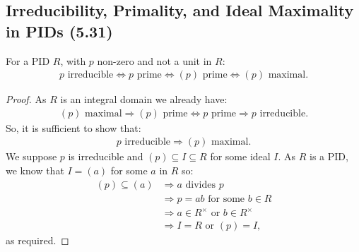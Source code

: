 \subsection{Irreducibility, Primality, and Ideal Maximality in PIDs (5.31)} \label{5.31}

For a PID $R$, with $p$ non-zero and not a unit in $R$: \begin{align*}
    p \text{ irreducible} 
    \Longleftrightarrow p \text{ prime}
    \Longleftrightarrow (p) \text{ prime}
    \Longleftrightarrow (p) \text{ maximal}.
\end{align*}

\begin{proof}
    As $R$ is an integral domain we already have: \begin{align*}
        (p) \text{ maximal}
        \Longrightarrow (p) \text{ prime}
        \Longleftrightarrow p \text{ prime}
        \Longrightarrow p \text{ irreducible}.
    \end{align*} So, it is sufficient to show that: \begin{align*}
        p \text{ irreducible} \Longrightarrow (p) \text{ maximal}.
    \end{align*} We suppose $p$ is irreducible and $(p) \subseteq I \subseteq R$
    for some ideal $I$. As $R$ is a PID, we know that $I = (a)$ for some $a$ in
    $R$ so: \begin{align*}
        (p) \subseteq (a) 
        &\Longrightarrow a \text{ divides } p \\
        &\Longrightarrow p = ab \text{ for some } b \in R \\
        &\Longrightarrow a \in R^\times \text{ or } b \in R^\times \tag{$p$ irreducible} \\
        &\Longrightarrow I = R \text{ or } (p) = I,
    \end{align*} as required.
\end{proof}
